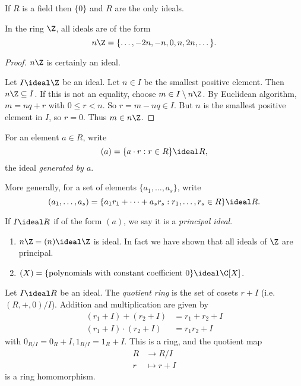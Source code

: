 \documentclass[a4paper]{article}
\theoremstyle{definition}
\begin{document}
\begin{eg}
  If \(R\) is a field then \(\{0\}\) and \(R\) are the only ideals.
\end{eg}

\begin{eg}
  In the ring \(\Z\), all ideals are of the form
  \[
    n\Z = \{\dots, -2n, -n, 0, n, 2n, \dots\}.
  \]
\end{eg}

\begin{proof}
  \(n\Z\) is certainly an ideal.

  Let \(I \ideal \Z\) be an ideal. Let \(n \in I\) be the smallest positive element. Then \(n\Z \subseteq I\). If this is not an equality, choose \(m \in I \setminus n\Z\). By Euclidean algorithm, \(m = nq + r\) with \(0 \leq r < n\). So \(r = m - nq \in I\). But \(n\) is the smallest positive element in \(I\), so \(r = 0\). Thus \(m \in n\Z\).
\end{proof}

\begin{definition}
  For an element \(a \in R\), write
  \[
    (a) = \{a \cdot r: r \in R\} \ideal R,
  \]
  the ideal \emph{generated by \(a\)}.

  More generally, for a set of elements \(\{a_1, \dots, a_s\}\), write
  \[
    (a_1, \dots, a_s) = \{a_1r_1 + \dots + a_sr_s: r_1, \dots, r_s \in R\} \ideal R.
  \]
\end{definition}

\begin{definition}
  If \(I \ideal R\) if of the form \((a)\), we say it is a \emph{principal ideal}.
\end{definition}

\begin{eg}\leavevmode
  \begin{enumerate}
  \item \(n\Z = (n) \ideal \Z\) is ideal. In fact we have shown that all ideals of \(\Z\) are principal.
  \item \((X) = \{\text{polynomials with constant coefficient } 0\} \ideal \C[X]\).
  \end{enumerate}
\end{eg}

\begin{proposition}
  Let \(I \ideal R\) be an ideal. The \emph{quotient ring} is the set of cosets \(r + I\) (i.e.\ \((R, +, 0)/I\)). Addition and multiplication are given by
  \begin{align*}
    (r_1 + I) + (r_2 + I) &= r_1 + r_2 + I \\
    (r_1 + I) \cdot (r_2 + I) &= r_1r_2 + I
  \end{align*}
  with \(0_{R/I} = 0_R + I, 1_{R/I} = 1_R + I\). This is a ring, and the quotient map
  \begin{align*}
    R &\to R/I \\
    r &\mapsto r + I
  \end{align*}
  is a ring homomorphism.
\end{proposition}
\end{document}
